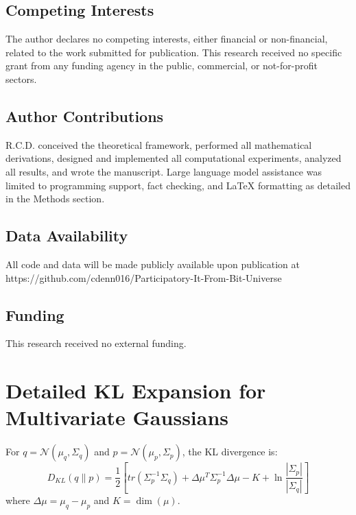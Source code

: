 \documentclass[11pt]{article}
\begin{document}
\subsection*{Competing Interests}
The author declares no competing interests, either financial or non-financial, related to the work submitted for publication. This research received no specific grant from any funding agency in the public, commercial, or not-for-profit sectors.

\subsection*{Author Contributions}
R.C.D. conceived the theoretical framework, performed all mathematical derivations, designed and implemented all computational experiments, analyzed all results, and wrote the manuscript. Large language model assistance was limited to programming support, fact checking, and LaTeX formatting as detailed in the Methods section.

\subsection*{Data Availability}
All code and data will be made publicly available upon publication at \\ 
https://github.com/cdenn016/Participatory-It-From-Bit-Universe

\subsection*{Funding}
This research received no external funding.




\appendix



\section{Detailed KL Expansion for Multivariate Gaussians}
\label{app:kl}

For $q = \mathcal{N}(\mu_q, \Sigma_q)$ and $p = \mathcal{N}(\mu_p, \Sigma_p)$, the KL divergence is:
\begin{equation}
D_{KL}(q \| p) = \frac{1}{2}\left[tr(\Sigma_p^{-1}\Sigma_q) + \Delta\mu^T \Sigma_p^{-1} \Delta\mu - K + \ln\frac{|\Sigma_p|}{|\Sigma_q|}\right]
\end{equation}
where $\Delta\mu = \mu_q - \mu_p$ and $K = \dim(\mu)$.
\end{document}
